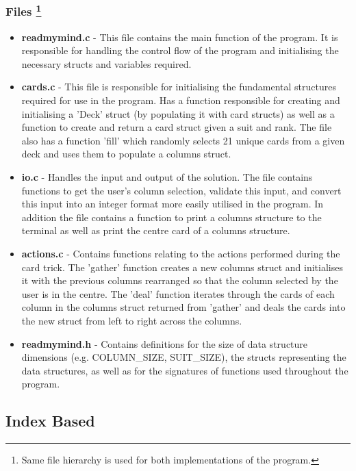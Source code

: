 \documentclass[11]{article}
\begin{document}
		\subsubsection{Files \footnote{Same file hierarchy is used for both implementations of the program.}}
				\begin{itemize}
					\item \textbf{readmymind.c} - This file contains the main function of the program. It is responsible for handling the control flow of the program and initialising the necessary structs and variables required.
					\item \textbf{cards.c} - This file is responsible for initialising the fundamental structures required for use in the program. Has a function responsible for creating and initialising a 'Deck' struct (by populating it with card structs) as well as a function to create and return a card struct given a suit and rank. The file also has a function 'fill' which randomly selects 21 unique cards from a given deck and uses them to populate a columns struct.
					\item \textbf{io.c} - Handles the input and output of the solution. The file contains functions to get the user's column selection, validate this input, and convert this input into an integer format more easily utilised in the program. In addition the file contains a function to print a columns structure to the terminal as well as print the centre card of a columns structure.
					\item \textbf{actions.c} - Contains functions relating to the actions performed during the card trick. The 'gather' function creates a new columns struct and initialises it with the previous columns rearranged so that the column selected by the user is in the centre. The 'deal' function iterates through the cards of each column in the columns struct returned from 'gather' and deals the cards into the new struct from left to right across the columns.
					\item \textbf{readmymind.h} - Contains definitions for the size of data structure dimensions (e.g. COLUMN\_SIZE, SUIT\_SIZE), the structs representing the data structures, as well as for the signatures of functions used throughout the program.
				\end{itemize}
		\subsection{Index Based}
			
			\newpage
\end{document}
